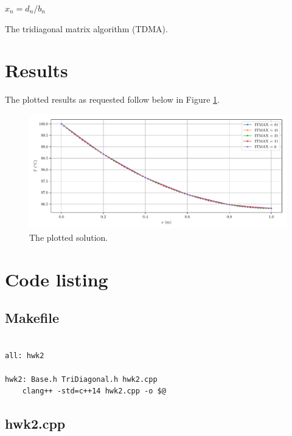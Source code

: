 \documentclass{article}
\begin{document}
\begin{algorithm}[H]
	$x_n = d_n / b_n$\;
	\caption{The tridiagonal matrix algorithm (TDMA).}
	\label{alg:tdma}
\end{algorithm}

\section*{Results}

The plotted results as requested follow below in Figure \ref{fig:results}.

\begin{figure}[H]
	\centering
	\includegraphics[width=\linewidth]{../python/result}
	\caption{The plotted solution.}
	\label{fig:results}
\end{figure}

\section*{Code listing}

\subsection*{Makefile}

\begin{verbatim}

all: hwk2

hwk2: Base.h TriDiagonal.h hwk2.cpp
	clang++ -std=c++14 hwk2.cpp -o $@

\end{verbatim}

\subsection*{hwk2.cpp}
\end{document}

